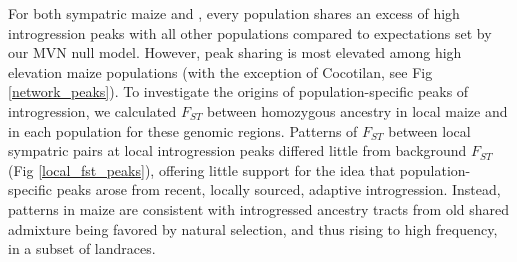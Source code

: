 For both sympatric maize and \mexicana, every population shares an excess of high introgression peaks with all other populations compared to expectations set by our MVN null model. 
However, peak sharing is most elevated among high elevation maize populations (with the exception of Cocotilan, see Fig \ref{network_peaks}). 
To investigate the origins of population-specific peaks of introgression, we calculated $F_{ST}$ between homozygous \mexicana ancestry in local maize and in each \mexicana population for these genomic regions.
Patterns of $F_{ST}$ between local sympatric pairs at local introgression peaks differed little from background $F_{ST}$ (Fig \ref{local_fst_peaks}), offering little support for the idea that population-specific peaks arose from recent, locally sourced, adaptive introgression.
Instead, patterns in maize are consistent with introgressed \mexicana ancestry tracts from old shared admixture being favored by natural selection, and thus rising to high frequency, in a subset of landraces. 

